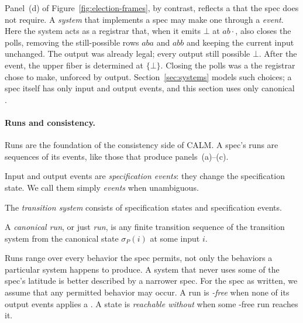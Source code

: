 Panel~(d) of Figure~\ref{fig:election-frames}, by contrast, reflects a
\commitment that the spec does not require.  A \emph{system} that implements a
spec may make one through a \emph{\commitment event}.  Here the system acts as
a registrar that, when it emits $\bot$ at $ab\cdot$, also closes the polls,
removing the still-possible rows $aba$ and $abb$ and keeping the current input
unchanged.  The output was already legal; every output still possible
\outrelpast $\bot$.  After the event, the upper fiber is determined at
$\{\bot\}$.  Closing the polls was a \commitment the registrar chose to make, unforced by output.
Section~\ref{sec:systems} models such choices; a spec itself has only input and
output events, and this section uses only canonical \commitments.

\paragraph{Runs and consistency.}
Runs are the foundation of the consistency side of CALM.  A spec's runs are
sequences of its events, like those that produce panels~(a)--(c).

\begin{definition}
\label{def:specification-event}
Input and output events are \emph{specification events}: they change the
specification state.  We call them simply \emph{events} when unambiguous.
\end{definition}

\begin{definition}
\label{def:transition-system}
The \emph{transition system} consists of specification states and
specification events.
\end{definition}

\begin{definition}
\label{def:run}
A \emph{canonical run}, or just \emph{run}, is any finite transition sequence of the transition system from the
canonical state $\sigma_P(i)$ at some input $i$.
\end{definition}

Runs range over every behavior the spec permits, not only the behaviors a
particular system happens to produce.  A system that never uses some of the
spec's latitude is better described by a narrower spec.  For the spec as
written, we assume that any permitted behavior may occur.  A run is
\emph{\commitment-free} when none of its output events applies a
\commitment.  A state is \emph{reachable without \commitment} when some
\commitment-free run reaches it.

